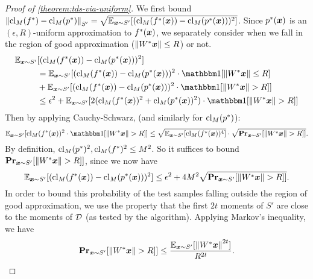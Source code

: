 \documentclass[11pt]{article} %
\numberwithin{equation}{section}
\begin{document}
\begin{proof}[Proof of \cref{theorem:tds-via-uniform}]
    We first bound $\left\| \mathrm{cl}_M(f^{*}) - \mathrm{cl}_M(p^{*}) \right\|_{S'} = \sqrt{\mathbb{E}_{{\bm{x}} \sim S'}[(\mathrm{cl}_M(f^{*}({\bm{x}})) - \mathrm{cl}_M(p^{*}({\bm{x}})))^2]}$. Since $p^*({\bm{x}})$ is an $(\epsilon, R)$-uniform approximation to $f^*({\bm{x}})$, we separately consider when we fall in the region of good approximation ($\left\| W^*{\bm{x}} \right\| \le R$) or not. 
    \begin{align*}
        \E_{\x \sim S'}&[(\fsMx - \psMx)^2] \\
        &= \E_{\x \sim S'}[(\fsMx - \psMx)^2 \cdot \ind[\Norm{W^*\x} \le R] \\
        &+ \E_{\x \sim S'}[(\fsMx - \psMx)^2 \cdot \ind[\Norm{W^*\x} >R]] \\
        &\le \epsilon^2 + \E_{\x \sim S'}[2(\fsMx^2 + \psMx^2) \cdot \ind[\Norm{W^*\x} >R]]
    \end{align*}
    Then by applying Cauchy-Schwarz, (and similarly for $\mathrm{cl}_M(p^{*})$):
    \[\E_{\x \sim S'}[\fsMx^2 \cdot \ind[\Norm{W^*\x} >R]] \le \sqrt{\E_{\x \sim S'}[\fsMx^4]} \cdot \sqrt{\Pr_{\x \sim S'}[\Norm{W^*\x} >R]]}.
    \] 
    By definition, $\mathrm{cl}_M(p^{*})^2, \mathrm{cl}_M(f^{*})^2 \le M^2$. So it suffices to bound $\mathbf{Pr}_{{\bm{x}} \sim S'}[\left\| W^*{\bm{x}} \right\| >R]]$, since we now have
    \begin{equation}
    \label{eqn: clip_1}
    \mathbb{E}_{{\bm{x}} \sim S'}[(\mathrm{cl}_M(f^{*}({\bm{x}})) - \mathrm{cl}_M(p^{*}({\bm{x}})))^2] \le \epsilon^2 + 4M^2 \sqrt{\mathbf{Pr}_{{\bm{x}} \sim S'}[\left\| W^*{\bm{x}} \right\| >R]]}.
    \end{equation}
    In order to bound this probability of the test samples falling outside the region of good approximation, we use the property that the first $2t$ moments of $S'$ are close to the moments of ${\mathcal{D}}$ (as tested by the algorithm). Applying Markov's inequality, we have
    \[
    \mathbf{Pr}_{{\bm{x}} \sim S'}[\left\| W^*{\bm{x}} \right\| >R]] \le \frac{\mathbb{E}_{{\bm{x}} \sim S'}[\left\| W^*{\bm{x}} \right\|^{2t}]}{R^{2t}}.
    \]


\end{proof}
\end{document}
